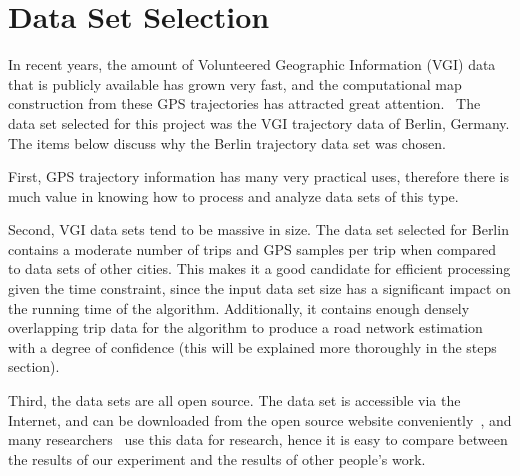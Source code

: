 \documentclass[11pt]{article}
\begin{document}
\section*{Data Set Selection}
\par
In recent years, the amount of Volunteered Geographic Information (VGI) data that is publicly available has grown very fast, and the computational map construction from these GPS trajectories has attracted great attention.~\cite{Wang15} The data set selected for this project was the VGI trajectory data of Berlin, Germany. The items below discuss why the Berlin trajectory data set was chosen.%
\par
First, GPS trajectory information has many very practical uses, therefore there is much value in knowing how to process and analyze data sets of this type. 
\par
Second, VGI data sets tend to be massive in size. The data set selected for Berlin contains a moderate number of trips and GPS samples per trip when compared to data sets of other cities. This makes it a good candidate for efficient processing given the time constraint, since the input data set size has a significant impact on the running time of the algorithm. Additionally, it contains enough densely overlapping trip data for the algorithm to produce a road network estimation with a degree of confidence (this will be explained more thoroughly in the steps section).%
\par
Third, the data sets are all open source. The data set is accessible via the Internet, and can be downloaded from the open source website conveniently~\cite{link}, and many researchers~\cite{Wang15} use this data for research, hence it is easy to compare between the results of our experiment and the results of other people's work.
\end{document}
